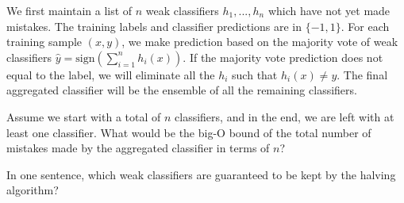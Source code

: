 \documentclass[11pt,addpoints,answers]{exam}
\newcommand{\sall}{\textbf{Select all that apply: }}
\begin{document}
\begin{questions}
\begin{parts}
We first maintain a list of $n$ weak classifiers $h_1, ..., h_n$ which have not yet made mistakes. The training labels and classifier predictions are in $\{-1, 1\}$. For each training sample $(x,y)$, we make prediction based on the majority vote of weak classifiers $\hat{y} = \text{sign} (\sum_{i = 1}^n h_i(x))$. If the majority vote prediction does not equal to the label, we will eliminate all the $h_i$ such that $h_i(x) \neq y$. The final aggregated classifier will be the ensemble of all the remaining classifiers.
\begin{subparts}
\subpart[1]
Assume we start with a total of $n$ classifiers, and in the end, we are left with at least one classifier. What would be the big-O bound of the total number of mistakes made by the aggregated classifier in terms of $n$?

\begin{your_solution}[height=2.5cm, width=4cm]
\end{your_solution}



\subpart[1] 
In one sentence, which weak classifiers are guaranteed to be kept by the halving algorithm? 

 \begin{your_solution}[height=3cm, width=.95\textwidth]
    \end{your_solution}





\end{subparts}
\end{parts}
\end{questions}
\end{document}
